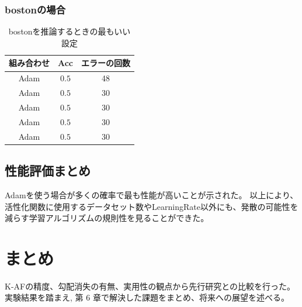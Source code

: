 \subsubsection{bostonの場合}

\begin{table}[htbp]
    \begin{center}
        \caption{bostonを推論するときの最もいい設定}
        \label{bostonbest}
        \vspace{2mm} 
        \begin{tabular}{ |c|c|c| }
        組み合わせ & Acc & エラーの回数 \\
        \hline
        Adam      & $ 0.5 $    & 48 \\
        Adam      & $ 0.5 $    & 30 \\
        Adam      & $ 0.5 $    & 30 \\
        Adam      & $ 0.5 $    & 30 \\
        Adam      & $ 0.5 $    & 30 \\
        \end{tabular}
    \end{center}
\end{table}




\subsection{性能評価まとめ}
Adamを使う場合が多くの確率で最も性能が高いことが示された。
以上により、活性化関数に使用するデータセット数やLearningRate以外にも、発散の可能性を減らす学習アルゴリズムの規則性を見ることができた。



\section{まとめ}

K-AFの精度、勾配消失の有無、実用性の観点から先行研究との比較を行った。
実験結果を踏まえ, 第 6 章で解決した課題をまとめ、将来への展望を述べる。


